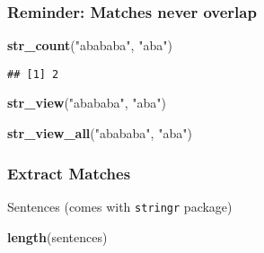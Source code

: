 \documentclass[
]{article}
\newenvironment{Shaded}{\begin{snugshade}}{\end{snugshade}}
\newcommand{\KeywordTok}[1]{\textcolor[rgb]{0.13,0.29,0.53}{\textbf{#1}}}
\newcommand{\NormalTok}[1]{#1}
\newcommand{\StringTok}[1]{\textcolor[rgb]{0.31,0.60,0.02}{#1}}
\begin{document}
\hypertarget{reminder-matches-never-overlap}{%
\subsubsection{Reminder: Matches never
overlap}\label{reminder-matches-never-overlap}}

\begin{Shaded}
\begin{Highlighting}[]
\KeywordTok{str\_count}\NormalTok{(}\StringTok{"abababa"}\NormalTok{, }\StringTok{"aba"}\NormalTok{)}
\end{Highlighting}
\end{Shaded}

\begin{verbatim}
## [1] 2
\end{verbatim}

\begin{Shaded}
\begin{Highlighting}[]
\KeywordTok{str\_view}\NormalTok{(}\StringTok{"abababa"}\NormalTok{, }\StringTok{"aba"}\NormalTok{)}
\end{Highlighting}
\end{Shaded}

\hypertarget{htmlwidget-aa8d8aefb9d859f44874}{}
\begin{str_view}

\end{str_view}

\begin{Shaded}
\begin{Highlighting}[]
\KeywordTok{str\_view\_all}\NormalTok{(}\StringTok{"abababa"}\NormalTok{, }\StringTok{"aba"}\NormalTok{)}
\end{Highlighting}
\end{Shaded}

\hypertarget{htmlwidget-84e2f8de2e035cacd5d8}{}
\begin{str_view}

\end{str_view}

\hypertarget{extract-matches}{%
\subsubsection{Extract Matches}\label{extract-matches}}

Sentences (comes with \texttt{stringr} package)

\begin{Shaded}
\begin{Highlighting}[]
\KeywordTok{length}\NormalTok{(sentences)}
\end{Highlighting}
\end{Shaded}
\end{document}
